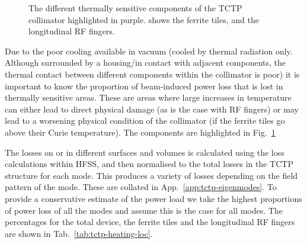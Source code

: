 \begin{figure}
\caption{The different thermally sensitive components of the TCTP collimator highlighted in purple.  shows the ferrite tiles, and  the longitudinal RF fingers.}
\label{fig:tctp-heat-loc}
\end{figure}

Due to the poor cooling available in vacuum (cooled by thermal radiation only. Although surrounded by a housing/in contact with adjacent components, the thermal contact between different components within the collimator is poor) it is important to know the proportion of beam-induced power loss that is lost in thermally sensitive areas. These are areas where large increases in temperature can either lead to direct physical damage (as is the case with RF fingers) or may lead to a worsening physical condition of the collimator (if the ferrite tiles go above their Curie temperature). The components are highlighted in Fig.~\ref{fig:tctp-heat-loc}

The losses on or in different surfaces and volumes is calculated using the loss calculations within HFSS, and then normalised to the total losses in the TCTP structure for each mode. This produces a variety of losses depending on the field pattern of the mode. These are collated in App.~\ref{app:tctp-eigenmodes}. To provide a conservative estimate of the power load we take the highest proportions of power loss of all the modes and assume this is the case for all modes. The percentages for the total device, the ferrite tiles and the longitudinal RF fingers are shown in Tab.~\ref{tab:tctp-heating-loc}. 


